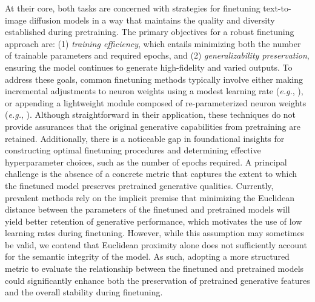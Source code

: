 At their core, both tasks are concerned with strategies for finetuning text-to-image diffusion models in a way that maintains the quality and diversity established during pretraining. The primary objectives for a robust finetuning approach are: (1) \emph{training efficiency}, which entails minimizing both the number of trainable parameters and required epochs, and (2) \emph{generalizability preservation}, ensuring the model continues to generate high-fidelity and varied outputs. To address these goals, common finetuning methods typically involve either making incremental adjustments to neuron weights using a modest learning rate (\emph{e.g.}, \cite{ruiz2023dreambooth}), or appending a lightweight module composed of re-parameterized neuron weights (\emph{e.g.}, \cite{hulora2022,zhang2023adding}). Although straightforward in their application, these techniques do not provide assurances that the original generative capabilities from pretraining are retained. Additionally, there is a noticeable gap in foundational insights for constructing optimal finetuning procedures and determining effective hyperparameter choices, such as the number of epochs required. A principal challenge is the absence of a concrete metric that captures the extent to which the finetuned model preserves pretrained generative qualities. Currently, prevalent methods rely on the implicit premise that minimizing the Euclidean distance between the parameters of the finetuned and pretrained models will yield better retention of generative performance, which motivates the use of low learning rates during finetuning. However, while this assumption may sometimes be valid, we contend that Euclidean proximity alone does not sufficiently account for the semantic integrity of the model. As such, adopting a more structured metric to evaluate the relationship between the finetuned and pretrained models could significantly enhance both the preservation of pretrained generative features and the overall stability during finetuning.

